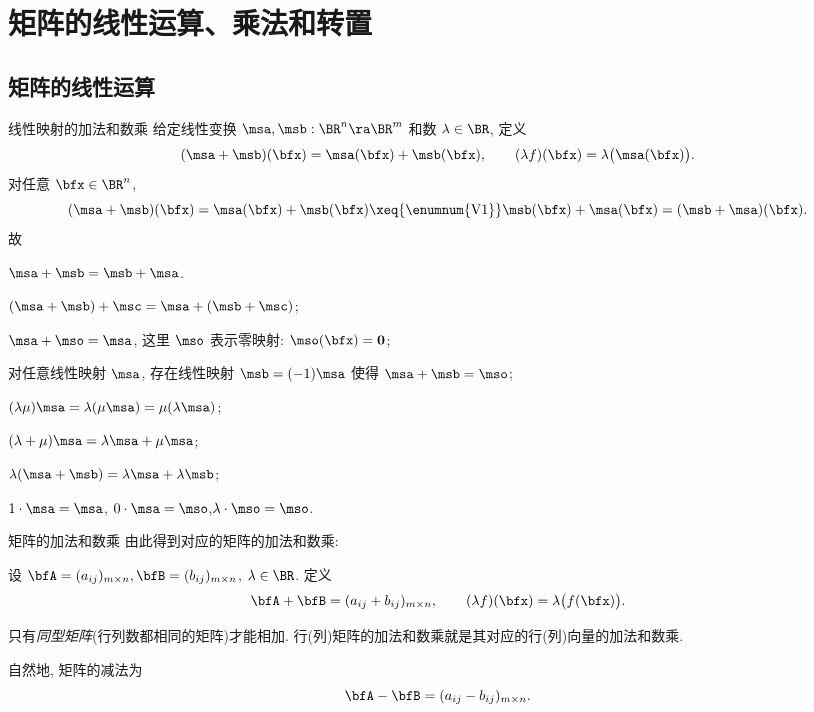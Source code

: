 \section{矩阵的线性运算、乘法和转置}


\subsection{矩阵的线性运算}
\begin{frame}{线性映射的加法和数乘}
	\onslide<+->
	给定线性变换 $\msa,\msb:\BR^n\ra\BR^m$ 和数 $\lambda\in\BR$,
	\onslide<+->
	定义
	\[(\msa+\msb)(\bfx)=\msa(\bfx)+\msb(\bfx),\qquad (\lambda f)(\bfx)=\lambda\bigl(\msa(\bfx)\bigr).\]
	\onslide<+->
	对任意 $\bfx\in\BR^n$,
	\[(\msa+\msb)(\bfx)=\msa(\bfx)+\msb(\bfx)\xeq{\text{\enumnum{V1}}}\msb(\bfx)+\msa(\bfx)=(\msb+\msa)(\bfx).\]
	\onslide<+->
	故
	\begin{enumnopar}
		\item $\msa+\msb=\msb+\msa$. \onslide<+->{同理}
		\item $(\msa+\msb)+\msc=\msa+(\msb+\msc)$;
		\item $\msa+\mso=\msa$, 这里 $\mso$ 表示零映射: $\mso(\bfx)={\bf0}$;
		\item 对任意线性映射 $\msa$, 存在线性映射 $\msb=(-1)\msa$ 使得 $\msa+\msb=\mso$;
		\item $(\lambda \mu)\msa=\lambda(\mu\msa)=\mu(\lambda\msa)$;
		\item $(\lambda+\mu)\msa=\lambda\msa+\mu\msa$;
		\item $\lambda(\msa+\msb)=\lambda\msa+\lambda\msb$;
		\item $1\cdot \msa=\msa$, $0\cdot \msa=\mso$,$\lambda\cdot\mso=\mso$.
	\end{enumnopar}
\end{frame}


\begin{frame}{矩阵的加法和数乘}
	\onslide<+->
	由此得到对应的矩阵的加法和数乘:
	\onslide<+->
	\begin{definition}
		设 $\bfA=(a_{ij})_{m\times n},\bfB=(b_{ij})_{m\times n}$, $\lambda\in\BR$.
		定义
			\[\bfA+\bfB=(a_{ij}+b_{ij})_{m\times n},\qquad 
			(\lambda f)(\bfx)=\lambda\bigl(f(\bfx)\bigr).\]
	\end{definition}
	\onslide<+->
	只有\emph{同型矩阵}(行列数都相同的矩阵)才能相加.
	\onslide<+->
	行(列)矩阵的加法和数乘就是其对应的行(列)向量的加法和数乘.

	\onslide<+->
	自然地, 矩阵的减法为
	\[\bfA-\bfB=(a_{ij}-b_{ij})_{m\times n}.\]
\end{frame}


